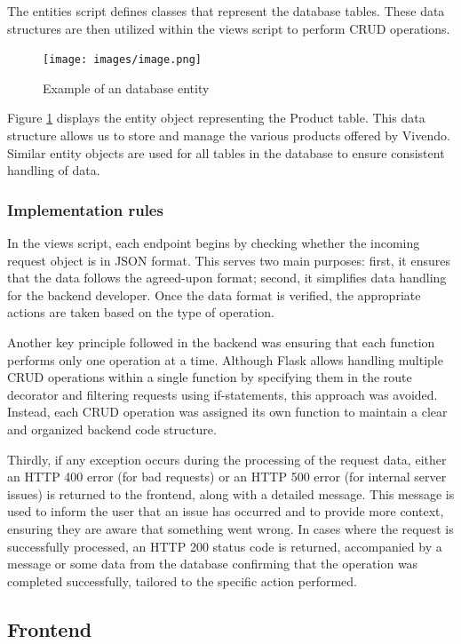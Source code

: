 The entities script defines classes that represent the database tables. These data structures are then utilized within the views script to perform CRUD operations.

\begin{figure}[h]
    \centering
    \texttt{[image: images/image.png]}
    \caption{Example of an database entity}
    \label{fig:db-entity}
\end{figure}

Figure \ref{fig:db-entity} displays the entity object representing the Product table. This data structure allows us to store and manage the various products offered by Vivendo. Similar entity objects are used for all tables in the database to ensure consistent handling of data.

\subsubsection{Implementation rules}
In the views script, each endpoint begins by checking whether the incoming request object is in JSON format. This serves two main purposes: first, it ensures that the data follows the agreed-upon format; second, it simplifies data handling for the backend developer. Once the data format is verified, the appropriate actions are taken based on the type of operation.

Another key principle followed in the backend was ensuring that each function performs only one operation at a time. Although Flask allows handling multiple CRUD operations within a single function by specifying them in the route decorator and filtering requests using if-statements, this approach was avoided. Instead, each CRUD operation was assigned its own function to maintain a clear and organized backend code structure.

Thirdly, if any exception occurs during the processing of the request data, either an HTTP 400 error (for bad requests) or an HTTP 500 error (for internal server issues) is returned to the frontend, along with a detailed message. This message is used to inform the user that an issue has occurred and to provide more context, ensuring they are aware that something went wrong. In cases where the request is successfully processed, an HTTP 200 status code is returned, accompanied by a message or some data from the database confirming that the operation was completed successfully, tailored to the specific action performed.

\subsection{Frontend}

